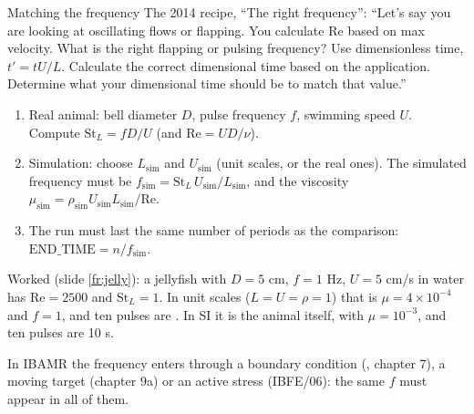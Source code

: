 \documentclass[aspectratio=169,11pt]{beamer}
\begin{document}
\begin{frame}{Matching the frequency}
\label{fr:freq}
\small The 2014 recipe, ``The right frequency'': ``Let's say you are looking at oscillating flows or flapping. You calculate Re based on max velocity. What is the right flapping or pulsing frequency? Use dimensionless time, $t' = tU/L$. Calculate the correct dimensional time based on the application. Determine what your dimensional time should be to match that value.''
\begin{enumerate}
  \item Real animal: bell diameter $D$, pulse frequency $f$, swimming speed $U$. Compute $\mathrm{St}_L = fD/U$ (and $\mathrm{Re} = UD/\nu$).
  \item Simulation: choose $L_{\mathrm{sim}}$ and $U_{\mathrm{sim}}$ (unit scales, or the real ones). The simulated frequency must be $f_{\mathrm{sim}} = \mathrm{St}_L\,U_{\mathrm{sim}}/L_{\mathrm{sim}}$, and the viscosity $\mu_{\mathrm{sim}} = \rho_{\mathrm{sim}} U_{\mathrm{sim}} L_{\mathrm{sim}}/\mathrm{Re}$.
  \item The run must last the same number of periods as the comparison: $\mathrm{END\_TIME} = n/f_{\mathrm{sim}}$.
\end{enumerate}
\vspace{1mm}
\small Worked (slide \ref{fr:jelly}): a jellyfish with $D = 5$ cm, $f = 1$ Hz, $U = 5$ cm/s in water has $\mathrm{Re} = 2500$ and $\mathrm{St}_L = 1$. In unit scales ($L = U = \rho = 1$) that is $\mu = 4\times10^{-4}$ and $f = 1$, and ten pulses are . In SI it is the animal itself, with $\mu = 10^{-3}$, and ten pulses are 10 s.
\vspace{1mm}

\small In IBAMR the frequency enters through a boundary condition (, chapter 7), a moving target (chapter 9a) or an active stress (IBFE/06): the same $f$ must appear in all of them.
\end{frame}
\end{document}
